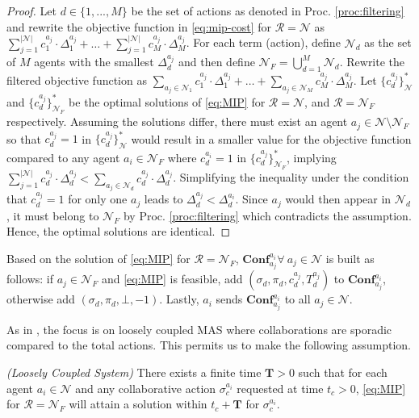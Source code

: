\begin{proof}
    Let $d\in\{1,...,M\}$ be the set of actions as denoted in Proc. \ref{proc:filtering} and rewrite the objective function in \eqref{eq:mip-cost} for $\mathcal{R}=\mathcal{N}$ as $\sum^{|\mathcal{N}|}_{j=1}c^{a_j}_{1}\cdot \Delta^{a_j}_1 +\ldots + \sum^{|\mathcal{N}|}_{j=1}c^{a_j}_{M}\cdot \Delta^{a_j}_M$. For each term (action), define $\mathcal{N}_d$ as the set of $M$ agents with the smallest $\Delta^{a_j}_d$ and then define $\mathcal{N}_F = \bigcup_{d=1}^{M} \mathcal{N}_d$. Rewrite the filtered objective function as $\sum_{a_j\in\mathcal{N}_1}c^{a_j}_{1}\cdot \Delta^{a_j}_1 +\ldots + \sum_{a_j\in\mathcal{N}_M}c^{a_j}_{M}\cdot \Delta^{a_j}_M$. Let $\{c^{a_j}_d\}^{*}_{\mathcal{N}}$ and $\{c^{a_j}_d\}^{*}_{\mathcal{N}_F}$ be the optimal solutions of \eqref{eq:MIP} for $\mathcal{R}=\mathcal{N}$, and $\mathcal{R}=\mathcal{N}_F$ respectively. Assuming the solutions differ, there must exist an agent $a_j \in \mathcal{N} \setminus \mathcal{N}_F$ so that $c^{a_j}_d = 1$ in $\{c^{a_j}_d\}^{*}_{\mathcal{N}}$ would result in a smaller value for the objective function compared to any agent $a_i \in \mathcal{N}_F$ where $c^{a_i}_d = 1$ in $\{c^{a_j}_d\}^{*}_{\mathcal{N}_F}$, implying $\sum^{|\mathcal{N}|}_{j=1}c^{a_j}_{d}\cdot \Delta^{a_j}_d<\sum_{a_j\in\mathcal{N}_d}c^{a_j}_{d}\cdot \Delta^{a_j}_d$.  Simplifying the inequality under the condition that $c^{a_j}_{d} = 1$ for only one $a_j$ leads to $\Delta^{a_j}_d < \Delta^{a_i}_d$. Since $a_j$ would then appear in $\mathcal{N}_d$, it must belong to $\mathcal{N}_F$ by Proc. \ref{proc:filtering} which contradicts the assumption. Hence, the optimal solutions are identical.
\end{proof}
Based on the solution of \eqref{eq:MIP} for $\mathcal{R}=\mathcal{N}_F$, $\mathbf{Conf}^{a_i}_{a_j} \forall\ a_j \in \mathcal{N}$ is built as follows: if $a_j\in\mathcal{N}_F$ and \eqref{eq:MIP} is feasible, add $(\sigma_d, \pi_d, c^{a_j}_d, T^{a_j}_d)$ to $\mathbf{Conf}^{a_i}_{a_j}$, otherwise add $(\sigma_d, \pi_d, \bot, -1)$.
Lastly, $a_i$ sends $\mathbf{Conf}^{a_i}_{a_j}$ to all $a_j\in\mathcal{N}$.
\par As in \cite{meng_paper}, the focus is on loosely coupled MAS where collaborations are sporadic compared to the total actions. This permits us to make the following assumption.
\begin{assumption}\label{ass:loosely_coupled} \textit{(Loosely Coupled System)} There exists a finite time $\mathbf{T}>0$ such that for each agent $a_i\in\mathcal{N}$ and any collaborative action $\sigma^{a_i}_c$ requested at time $t_c>0$, \eqref{eq:MIP} for $\mathcal{R}=\mathcal{N}_F$ will attain a solution within $t_c + \mathbf{T}$ for $\sigma^{a_i}_c$.
\end{assumption}
